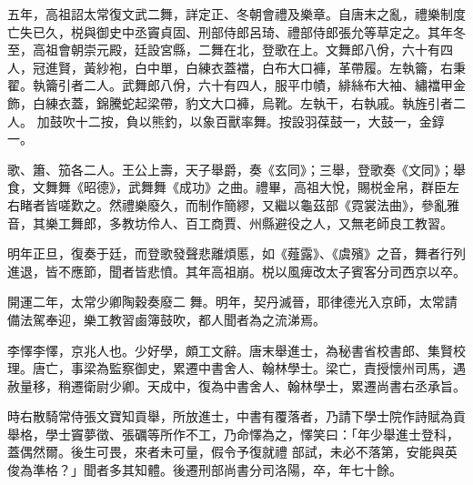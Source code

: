 \begin{pinyinscope}
 五年，高祖詔太常復文武二舞，詳定正、冬朝會禮及樂章。自唐末之亂，禮樂制度亡失已久，棁與御史中丞竇貞固、刑部侍郎呂琦、禮部侍郎張允等草定之。其年冬至，高祖會朝崇元殿，廷設宮縣，二舞在北，登歌在上。文舞郎八佾，六十有四人，冠進賢，黃紗袍，白中單，白練衣蓋襠，白布大口褲，革帶履。左執籥，右秉翟。執籥引者二人。武舞郎八佾，六十有四人，服平巾幘，緋絲布大袖、繡襠甲金飾，白練衣蓋，錦騰蛇起梁帶，豹文大口褲，烏靴。左執干，右執戚。執旌引者二人。
 加鼓吹十二按，負以熊釣，以象百獸率舞。按設羽葆鼓一，大鼓一，金錞一。



 歌、簫、笳各二人。王公上壽，天子舉爵，奏《玄同》；三舉，登歌奏《文同》；舉食，文舞舞《昭德》，武舞舞《成功》之曲。禮畢，高祖大悅，賜棁金帛，群臣左右睹者皆嗟歎之。然禮樂廢久，而制作簡繆，又繼以龜茲部《霓裳法曲》，參亂雅音，其樂工舞郎，多教坊伶人、百工商賈、州縣避役之人，又無老師良工教習。



 明年正旦，復奏于廷，而登歌發聲悲離煩慝，如《薤露》、《虞殯》之音，舞者行列進退，皆不應節，聞者皆悲憤。其年高祖崩。棁以風痺改太子賓客分司西京以卒。



 開運二年，太常少卿陶穀奏廢二
 舞。明年，契丹滅晉，耶律德光入京師，太常請備法駕奉迎，樂工教習鹵簿鼓吹，都人聞者為之流涕焉。



 李懌李懌，京兆人也。少好學，頗工文辭。唐末舉進士，為秘書省校書郎、集賢校理。唐亡，事梁為監察御史，累遷中書舍人、翰林學士。梁亡，責授懷州司馬，遇赦量移，稍遷衛尉少卿。天成中，復為中書舍人、翰林學士，累遷尚書右丞承旨。



 時右散騎常侍張文寶知貢舉，所放進士，中書有覆落者，乃請下學士院作詩賦為貢舉格，學士竇夢徵、張礪等所作不工，乃命懌為之，懌笑曰：「年少舉進士登科，蓋偶然爾。後生可畏，來者未可量，假令予復就禮
 部試，未必不落第，安能與英俊為準格？」聞者多其知體。後遷刑部尚書分司洛陽，卒，年七十餘。



\end{pinyinscope}